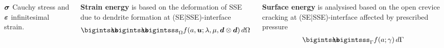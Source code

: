 \documentclass[25pt, a0paper,
portrait,
margin=2mm, 
innermargin=2mm, 
blockverticalspace=7mm, %
colspace=2mm, %
subcolspace=0mm]{tikzposter}
\begin{document}
\begin{columns}
{\begin{minipage}{0.35\textwidth}
\begin{mdframed}
				${\boldsymbol{\sigma}}$ Cauchy stress and 
				${\boldsymbol{\varepsilon}}$ infinitesimal strain.
				\vspace{-0.6cm}
			\end{mdframed}
			\begin{minipage}{0.5\textwidth}
				\begin{mdframed}
					\textbf{Strain energy} is based on the 
					deformation of SSE
					due to dendrite formation 
					at (SE|SSE)-interface 
					\begin{align*}
						\bigintsss\!\!\!\!\!\!\bigintsss\!\!\!\!\!\!\bigintsss_{\Omega}
						f(a,\bm{u};\lambda,\mu,\bm{d}\otimes\bm{d}) \, d\Omega 
					\end{align*}
				\end{mdframed}
			\end{minipage}
			\hfill 
			\begin{minipage}{0.49\textwidth}
				\begin{mdframed}
					\textbf{Surface energy}
					is analysised based on
					the open crevice 
					cracking at (SE|SSE)-interface
					affected by prescribed pressure
					\begin{align*} 
						\bigintsss\!\!\!\!\!\!\bigintsss_{\Gamma} f(a;\gamma) \, d\Gamma
					\end{align*}
				\end{mdframed}
			\end{minipage}

\end{minipage}}
\end{columns}
\end{document}
